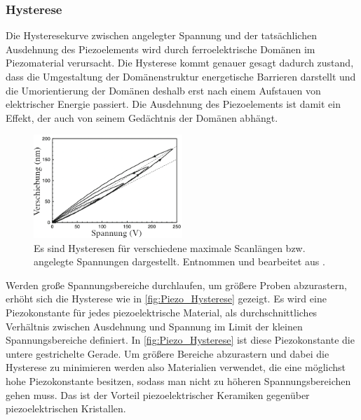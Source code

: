     \subsubsection*{Hysterese} \vspace*{-0.25cm}
        Die Hysteresekurve zwischen angelegter Spannung und der tatsächlichen Ausdehnung des Piezoelements wird durch ferroelektrische Domänen im Piezomaterial verursacht.
        Die Hysterese kommt genauer gesagt dadurch zustand, dass die Umgestaltung der Domänenstruktur energetische Barrieren darstellt und die Umorientierung der Domänen deshalb erst nach einem Aufstauen von elektrischer Energie passiert.
        Die Ausdehnung des Piezoelements ist damit ein Effekt, der auch von seinem Gedächtnis der Domänen abhängt.
        \begin{figure}[ht]
            \centering\captionsetup{format=plain}
            \includegraphics[width=0.5\textwidth]{bilder/Piezo_Hysterese.png}
            \caption{Es sind Hysteresen für verschiedene maximale Scanlängen bzw. angelegte Spannungen dargestellt. Entnommen und bearbeitet aus \cite{voigtlaender}.}
            \label{fig:Piezo_Hysterese}
        \end{figure}
        Werden große Spannungsbereiche durchlaufen, um größere Proben abzurastern, erhöht sich die Hysterese wie in \autoref{fig:Piezo_Hysterese} gezeigt.
        Es wird eine Piezokonstante für jedes piezoelektrische Material, als durchschnittliches Verhältnis zwischen Ausdehnung und Spannung im Limit der kleinen Spannungsbereiche definiert.
        In \autoref{fig:Piezo_Hysterese} ist diese Piezokonstante die untere gestrichelte Gerade.
        Um größere Bereiche abzurastern und dabei die Hysterese zu minimieren werden also Materialien verwendet, die eine möglichst hohe Piezokonstante besitzen, sodass man nicht zu höheren Spannungsbereichen gehen muss.
        Das ist der Vorteil piezoelektrischer Keramiken gegenüber piezoelektrischen Kristallen.      

